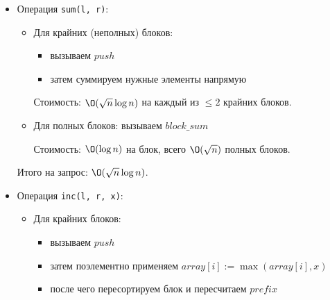 \begin{enumerate}
\begin{itemize}
\begin{itemize}
        Стоимость: $\O(B \log B) = \O(\sqrt{n} \log n)$.

        \item \texttt{block\_sum(b)} -- сумма элементов блока $b$ с учётом floor $f$:
        \begin{itemize}
          \item бинарным поиском в $sorted$ найдём индекс $j$ -- количество элементов, меньших $f$.
          
          \item тогда сумма блока равна $j \cdot f + (prefix[B] - prefix[j])$: первые $j$ элементов заменяются на $f$,
        остальные остаются без изменений
        \end{itemize}

        Стоимость: $\O(\log B) = \O(\log n)$.

      \end{itemize}

      \item Операция \texttt{sum(l, r)}:
      \begin{itemize}

        \item Для крайних (неполных) блоков:
        \begin{itemize}
          \item вызываем $push$
          \item затем суммируем нужные элементы напрямую
        \end{itemize}
        Стоимость: $\O(\sqrt{n} \log n)$ на каждый из $\leq 2$ крайних блоков.

        \item Для полных блоков: вызываем $block\_sum$
        
        Стоимость: $\O(\log n)$ на блок, всего $\O(\sqrt{n})$ полных блоков.
      \end{itemize}
      Итого на запрос: $\O(\sqrt{n} \log n)$.

      \item Операция \texttt{inc(l, r, x)}:
      \begin{itemize}

        \item Для крайних блоков:
        \begin{itemize}
          \item вызываем $push$
          \item затем поэлементно применяем $array[i] := \max(array[i], x)$
          \item после чего пересортируем блок и пересчитаем $prefix$
        \end{itemize}
        

\end{itemize}
\end{itemize}
\end{enumerate}
